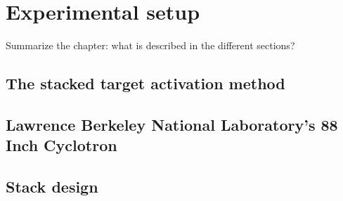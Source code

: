 \chapter{Experimental setup}
\label{experimental}
Summarize the chapter: what is described in the different sections?


\section{The stacked target activation method}
\section{Lawrence Berkeley National Laboratory's 88 Inch Cyclotron}
\section{Stack design}


